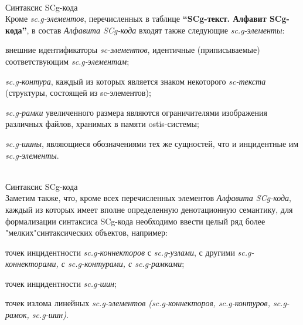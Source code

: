 \begin{frame}{\\Синтаксис SCg-кода}
	\topline
	\justifying
	\vspace*{\fill}\\
	Кроме \textit{sc.g-элементов}, перечисленных в таблице \textbf{“SCg-текст. Алфавит SCg-кода”}, в состав \textit{Алфавита SCg-кода} входят также следующие \textit{sc.g-элементы}:
	\begin{textitemize}
		\item внешние идентификаторы \textit{sc-элементов}, идентичные (приписываемые) соответствующим \textit{sc.g-элементам};
		\item \textit{sc.g-контура}, каждый из которых является знаком некоторого \textit{sc-текста} (структуры, состоящей из sc-элементов);
		\item \textit{sc.g-рамки} увеличенного размера являются ограничителями изображения различных файлов, хранимых в памяти ostis-системы;
		\item \textit{sc.g-шины}, являющиеся обозначениями тех же сущностей, что и инцидентные им \textit{sc.g-элементы}.
	\end{textitemize}
\end{frame}

\begin{frame}{\\Синтаксис SCg-кода}
	\topline
	\justifying
	\vspace*{\fill}\\
	Заметим также, что, кроме всех перечисленных элементов \textit{Алфавита SCg-кода}, каждый из которых имеет вполне определенную денотационную семантику, для формализации синтаксиса SCg-кода необходимо ввести целый ряд более "мелких"{}синтаксических объектов, например:
	\begin{textitemize}
		\item точек инцидентности \textit{sc.g-коннекторов} с \textit{sc.g-узлами}, с другими \textit{sc.g-коннекторами, с sc.g-контурами, с sc.g-рамками};
		\item точек инцидентности \textit{sc.g-шин};
		\item точек излома линейных \textit{sc.g-элементов (sc.g-коннекторов, sc.g-контуров, sc.g-рамок, sc.g-шин)}.
	\end{textitemize}
\end{frame}

